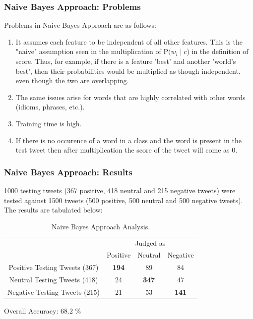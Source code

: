 \documentclass[12pt,xcolor=dvipsnames,table,titlepage]{beamer}
\begin{document}
\begin{frame}[t]
\frametitle{Naive Bayes Approach: Problems}
Problems in Naive Bayes Approach are as follows:
\begin{enumerate}
\item It assumes each feature to be independent of all other features. This is the "naive" assumption seen in the multiplication of P\((w_i \mid c\)) in the definition of score. Thus, for example, if there is a feature 'best' and another 'world's best', then their probabilities would be multiplied as though independent, even though the two are overlapping. 
\item The same issues arise for words that are highly correlated with other words (idioms, phrases, etc.).
\item Training time is high.
\item If there is no occurence of a word in a class and the word is present in the test tweet then after multiplication the score of the tweet will come as 0.
\end{enumerate}
\end{frame}

\begin{frame}[t]
\frametitle{Naive Bayes Approach: Results}
1000 testing tweets (367 positive, 418 neutral and 215 negative tweets) were tested against 1500 tweets \cite{dataset} (500 positive, 500 neutral and 500 negative tweets). The results are tabulated below:\\
\begin{table}[h]
\begin{tabular}{c|c|c|c|}
\cline{2-4}
                                                  & \multicolumn{3}{c|}{Judged as}                                                                                   \\ \cline{2-4} 
\multirow{-2}{*}{}                                & Positive                           & Neutral                              & Negative                             \\ \hline
\multicolumn{1}{|c|}{Positive Testing Tweets (367)} & {\color[HTML]{036400} \textbf{194}} & {\color[HTML]{680100} 89}            & {\color[HTML]{680100} 84}            \\ \hline
\multicolumn{1}{|c|}{Neutral Testing Tweets (418)}  & {\color[HTML]{680100} 24}        & {\color[HTML]{036400} \textbf{347}} & {\color[HTML]{680100} 47}          \\ \hline
\multicolumn{1}{|c|}{Negative Testing Tweets (215)} & {\color[HTML]{680100} 21}        & {\color[HTML]{680100} 53}          & {\color[HTML]{036400} \textbf{141}} \\ \hline
\end{tabular}
\caption{Naive Bayes Approach Analysis.}
Overall Accuracy: 68.2 \%
\par\smallskip
\end{table}
\end{frame}
\end{document}
